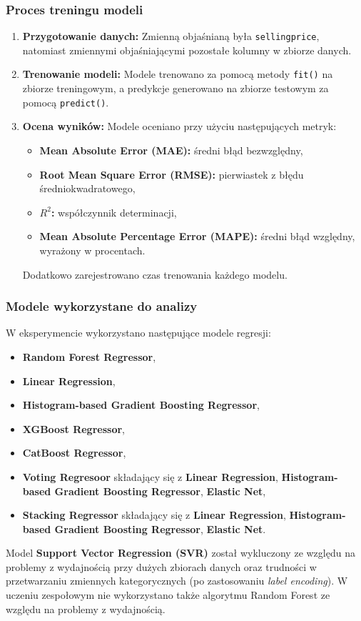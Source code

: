 \documentclass[10pt,letterpaper]{article}
\begin{document}
\subsubsection{Proces treningu modeli}
\begin{enumerate}
	\item \textbf{Przygotowanie danych:} Zmienną objaśnianą była \texttt{sellingprice}, natomiast zmiennymi objaśniającymi pozostałe kolumny w zbiorze danych.
	\item \textbf{Trenowanie modeli:} Modele trenowano za pomocą metody \texttt{fit()} na zbiorze treningowym, a predykcje generowano na zbiorze testowym za pomocą \texttt{predict()}.
	\item \textbf{Ocena wyników:} Modele oceniano przy użyciu następujących metryk:
	\begin{itemize}
		\item \textbf{Mean Absolute Error (MAE):} średni błąd bezwzględny,
		\item \textbf{Root Mean Square Error (RMSE):} pierwiastek z błędu średniokwadratowego,
		\item \textbf{\(R^2\):} współczynnik determinacji,
		\item \textbf{Mean Absolute Percentage Error (MAPE):} średni błąd względny, wyrażony w procentach.
	\end{itemize}
	Dodatkowo zarejestrowano czas trenowania każdego modelu.
\end{enumerate}

\newpage
\subsubsection{Modele wykorzystane do analizy}
W eksperymencie wykorzystano następujące modele regresji:
\begin{itemize}
	\item \textbf{Random Forest Regressor},
	\item \textbf{Linear Regression},
	\item \textbf{Histogram-based Gradient Boosting Regressor},
	\item \textbf{XGBoost Regressor},
	\item \textbf{CatBoost Regressor},
	\item \textbf{Voting Regresoor} składający się z \textbf{Linear Regression}, \textbf{Histogram-based Gradient Boosting Regressor}, \textbf{Elastic Net},
	\item \textbf{Stacking Regressor} składający się z \textbf{Linear Regression}, \textbf{Histogram-based Gradient Boosting Regressor}, \textbf{Elastic Net}.
\end{itemize}
Model \textbf{Support Vector Regression (SVR)} został wykluczony ze względu na problemy z wydajnością przy dużych zbiorach danych oraz trudności w przetwarzaniu zmiennych kategorycznych (po zastosowaniu \textit{label encoding}).
W uczeniu zespołowym nie wykorzystano także algorytmu Random Forest ze względu na problemy z wydajnością.
\end{document}
